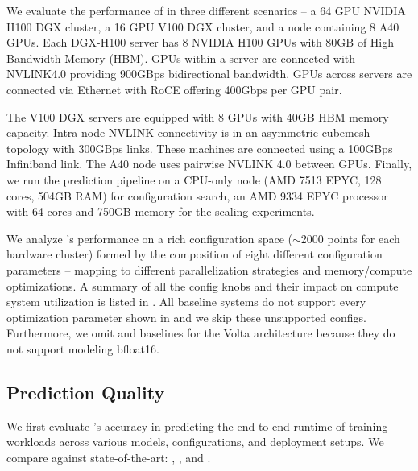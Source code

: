  We evaluate the performance of \sysname in three different scenarios -- a 64 GPU NVIDIA H100 DGX \cite{h100} cluster, a 16 GPU V100 \cite{v100} DGX cluster, and a node containing 8 A40 GPUs. Each DGX-H100 server has 8 NVIDIA H100 GPUs with 80GB of High Bandwidth Memory (HBM). GPUs within a server are connected with NVLINK4.0 providing 900GBps bidirectional bandwidth. GPUs across servers are connected via Ethernet with RoCE offering 400Gbps per GPU pair. 

The V100 DGX servers are equipped with 8 GPUs with 40GB HBM memory capacity. Intra-node NVLINK connectivity is in an asymmetric cubemesh topology \cite{v100} with 300GBps links. These machines are connected using a 100GBps Infiniband \cite{infiniband} link. The A40 node uses pairwise NVLINK 4.0 between GPUs. Finally, we run the \sysname prediction pipeline on a CPU-only node (AMD 7513 EPYC, 128 cores, 504GB RAM) for configuration search, an AMD 9334 EPYC processor with 64 cores and 750GB memory for the scaling experiments.

 We analyze \sysname's performance on a rich configuration space ($\sim$2000 points for each hardware cluster) formed by the composition of eight different configuration parameters -- mapping to different parallelization strategies and memory/compute optimizations. A summary of all the config knobs and their impact on compute system utilization is listed in . All baseline systems do not support every optimization parameter shown in  and we skip these unsupported configs. Furthermore, we omit \calc and \amped baselines for the Volta architecture because they do not support modeling bfloat16.


\vspace{-1em}

\subsection{Prediction Quality}
\label{sec:eval:fidelity}

We first evaluate \sysname's accuracy in predicting the end-to-end runtime of training workloads across various models, configurations, and deployment setups. We compare \sysname against state-of-the-art: \prot, \calc, and \amped.

